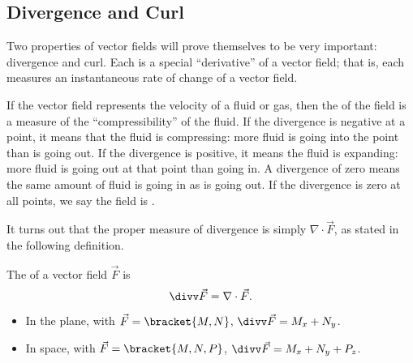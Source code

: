 \subsection{Divergence and Curl}

Two properties of vector fields will prove themselves to be very important: divergence and curl. Each is a special ``derivative'' of a vector field; that is, each measures an instantaneous rate of change of a vector field.

If the vector field represents the velocity of a fluid or gas, then the  of the field is a measure of the ``compressibility'' of the fluid. If the divergence is negative at a point, it means that the fluid is compressing: more fluid is going into the point than is going out. If the divergence is positive, it means the fluid is expanding: more fluid is going out at that point than going in. A divergence of zero means the same amount of fluid is going in as is going out. If the divergence is zero at all points, we say the field is .

It turns out that the proper measure of divergence is simply $\nabla \cdot \vec F$, as stated in the following definition.

{The  of a vector field $\vec F$ is
\[\divv \vec F = \nabla \cdot \vec F.\]
\begin{itemize}
	\item In the plane, with $\vec F =\bracket{M,N}$, $\divv \vec F = M_x+N_y$.
	\item	In space, with $\vec F =\bracket{M,N,P}$, $\divv \vec F = M_x+N_y+P_z$.
\end{itemize}}


